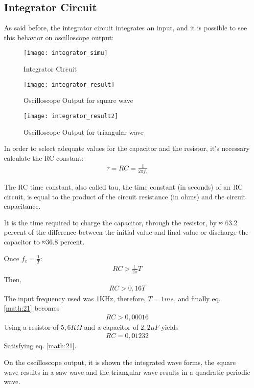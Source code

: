 \documentclass[journal]{IEEEtran}
\begin{document}
    \subsection{Integrator Circuit}
        \par As said before, the integrator circuit integrates an input, and it is possible to see this behavior on oscilloscope output:
        \begin{figure}[H]
            \centering
            \texttt{[image: integrator\_simu]}
            \caption{Integrator Circuit}
            \label{fig:integrator_circuit}
        \end{figure}
        \begin{figure}[H]
            \centering
            \texttt{[image: integrator\_result]}
            \caption{Oscilloscope Output for square wave}
            \label{fig:integrator_result}
        \end{figure}
        \begin{figure}
            \centering
            \texttt{[image: integrator\_result2]}
            \caption{Oscilloscope Output for triangular wave}
            \label{fig:integrator_result_2}
        \end{figure}{}
        In order to select adequate values for the capacitor and the resistor, it's necessary calculate the RC constant:
        \begin{align}
            \tau=RC={\frac{1}{2\pi f_{c}}} \label{math:19}
        \end{align}
        \par The RC time constant, also called tau, the time constant (in seconds) of an RC circuit, is equal to the product of the circuit resistance (in ohms) and the circuit capacitance.
        \par It is the time required to charge the capacitor, through the resistor, by ≈ 63.2 percent of the difference between the initial value and final value or discharge the capacitor to ≈36.8 percent.\cite{wiki:RC_time_constant}
        \par Once $f_c = \frac{1}{T}$:
        \begin{align}
            RC > \frac{1}{2\pi}T \label{math:20}
        \end{align}
        Then,
        \begin{align}
            RC > 0,16T \label{math:21}
        \end{align}
        The input frequency used was 1KHz, therefore, $T = 1ms$, and finally eq. \ref{math:21} becomes
        \begin{align}
            RC > 0,00016
        \end{align}
        Using a resistor of $5,6K\Omega$ and a capacitor of $2,2\mu F$ yields
        \begin{align}
            RC = 0,01232
        \end{align}
        Satisfying eq. \ref{math:21}.
        \par On the oscilloscope output, it is shown the integrated wave forms, the square wave results in a saw wave and the triangular wave results in a quadratic periodic wave.
\end{document}
